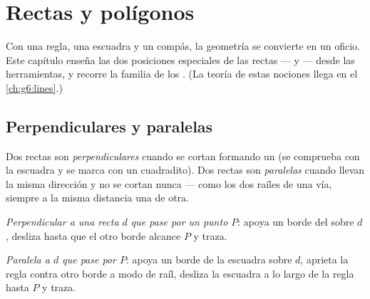 \chapter{Rectas y polígonos}\label{ch:g4:geometry}

Con una regla, una escuadra y un compás, la geometría se convierte en un oficio.
Este capítulo enseña las dos posiciones especiales de las rectas ---
 y  --- desde las herramientas, y recorre
la familia de los . (La teoría de estas nociones llega en el
\cref{ch:g6:lines}.)

\section{Perpendiculares y paralelas}

\begin{definition}\label{def:g4:geometry:def}
Dos rectas son \emph{perpendiculares} cuando
se cortan formando un  (se comprueba con la escuadra y se marca con
un cuadradito). Dos rectas son \emph{paralelas}
cuando llevan la misma dirección y no se cortan nunca --- como los dos
raíles de una vía, siempre a la misma distancia una de otra.
\end{definition}

\begin{method}\label{met:g4:geometry:draw}
\emph{Perpendicular a una recta $d$ que pase por un punto $P$}: apoya un borde
del  sobre $d$, desliza hasta que el otro borde alcance $P$ y
traza.

\emph{Paralela a $d$ que pase por $P$}: apoya un borde de la escuadra sobre
$d$, aprieta la regla contra otro borde a modo de raíl, desliza la escuadra
a lo largo de la regla hasta $P$ y traza.
\end{method}

